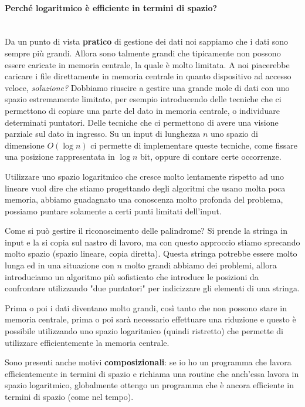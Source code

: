 \documentclass{article}
\begin{document}
\paragraph{Perché logaritmico è efficiente in termini di spazio?}\mbox{}\\

Da un punto di vista \textbf{pratico} di gestione dei dati noi sappiamo che i dati sono sempre più grandi. Allora
sono talmente grandi che tipicamente non possono essere caricate in memoria centrale, la quale
è molto limitata. A noi piacerebbe caricare i file direttamente in memoria centrale in quanto
dispositivo ad accesso veloce, \textit{soluzione?} Dobbiamo riuscire a gestire una grande
mole di dati con uno spazio estremamente limitato, per esempio introducendo delle tecniche che ci
permettono di copiare una parte del dato in memoria centrale, o individuare determinati puntatori.
Delle tecniche che ci permettono di avere una visione parziale sul dato in ingresso. Su un input
di lunghezza $n$ uno spazio di dimensione $O(\log n)$ ci permette di implementare queste tecniche,
come fissare una posizione rappresentata in $\log n$ bit, oppure di contare certe occorrenze.

Utilizzare uno spazio logaritmico che cresce molto lentamente rispetto ad uno lineare vuol dire che
stiamo progettando degli algoritmi che usano molta poca memoria, abbiamo guadagnato una conoscenza
molto profonda del problema, possiamo puntare solamente a certi punti limitati dell'input.

Come si può gestire il riconoscimento delle palindrome? Si prende la stringa in input e la si copia
sul nastro di lavoro, ma con questo approccio stiamo sprecando molto spazio (spazio lineare, copia
diretta). Questa stringa potrebbe essere molto lunga ed in una situazione con $n$ molto grandi
abbiamo dei problemi, allora introduciamo un algoritmo più sofisticato che introduce
le posizioni da confrontare utilizzando "due puntatori" per indicizzare gli elementi di una stringa.

Prima o poi i dati diventano molto grandi, così tanto che non possono stare in memoria centrale,
prima o poi sarà necessario effettuare una riduzione e questo è possibile utilizzando uno spazio
logaritmico (quindi ristretto) che permette di utilizzare efficientemente la memoria centrale.

Sono presenti anche motivi \textbf{composizionali}: se io ho un programma che lavora efficientemente
in termini di spazio e richiama una routine che anch'essa lavora in spazio logaritmico, globalmente
ottengo un programma che è ancora efficiente in termini di spazio (come nel tempo).
\end{document}
